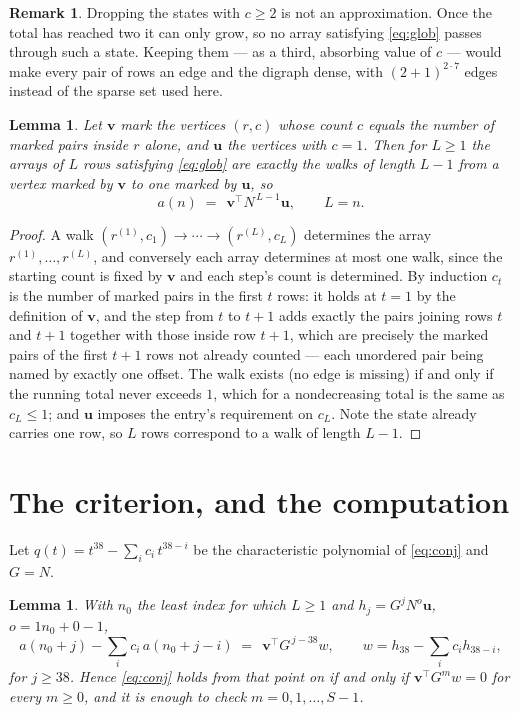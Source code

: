 \documentclass[11pt,a4paper]{article}
\theoremstyle{plain}
\newtheorem{lemma}[theorem]{Lemma}
\theoremstyle{definition}
\newtheorem{remark}[theorem]{Remark}
\begin{document}
\begin{remark}
Dropping the states with $c\ge2$ is not an approximation. Once the total has reached two it
can only grow, so no array satisfying \eqref{eq:glob} passes through such a state. Keeping
them --- as a third, absorbing value of $c$ --- would make every pair of rows an edge and
the digraph dense, with $(2+1)^{2\cdot7}$ edges instead of the sparse set used here.
\end{remark}

\begin{lemma}\label{lem:walk}
Let $\mathbf{v}$ mark the vertices $(r,c)$ whose count $c$ equals the number of marked pairs
inside $r$ alone, and $\mathbf{u}$ the vertices with $c=1$. Then for $L\ge1$ the arrays
of $L$ rows satisfying \eqref{eq:glob} are exactly the walks of length $L-1$ from a
vertex marked by $\mathbf{v}$ to one marked by $\mathbf{u}$, so
\[
a(n)\;=\;\,\mathbf{v}^{\!\top}N^{\,L-1}\mathbf{u},\qquad L=n .
\]
\end{lemma}

\begin{proof}
A walk $(r^{(1)},c_1)\to\cdots\to(r^{(L)},c_L)$ determines the array
$r^{(1)},\dots,r^{(L)}$, and conversely each array determines at most one walk, since the
starting count is fixed by $\mathbf{v}$ and each step's count is determined. By induction
$c_t$ is the number of marked pairs in the first $t$ rows: it holds at $t=1$ by the
definition of $\mathbf{v}$, and the step from $t$ to $t+1$ adds exactly the pairs joining
rows $t$ and $t+1$ together with those inside row $t+1$, which are precisely the marked
pairs of the first $t+1$ rows not already counted --- each unordered pair being named by
exactly one offset. The walk exists (no edge is missing) if and only if the running total
never exceeds $1$, which for a nondecreasing total is the same as $c_L\le1$; and
$\mathbf{u}$ imposes the entry's requirement on $c_L$. Note the state already carries one
row, so $L$ rows correspond to a walk of length $L-1$.
\end{proof}

\section{The criterion, and the computation}

Let $q(t)=t^{38}-\sum_i c_i\,t^{38-i}$ be the characteristic polynomial of
\eqref{eq:conj} and $G=N$.

\begin{lemma}\label{lem:crit}
With $n_0$ the least index for which $L\ge1$ and $h_j=G^{j}N^{o}\mathbf{u}$,
$o=1n_0+0-1$,
\[
a(n_0+j)-\sum_i c_i\,a(n_0+j-i)\;=\;\,\mathbf{v}^{\!\top}G^{\,j-38}w,
\qquad w=h_{38}-\sum_i c_i h_{38-i},
\]
for $j\ge38$. Hence \eqref{eq:conj} holds from that point on if and only if
$\mathbf{v}^{\!\top}G^{m}w=0$ for every $m\ge0$, and it is enough to check
$m=0,1,\dots,S-1$.
\end{lemma}
\end{document}
